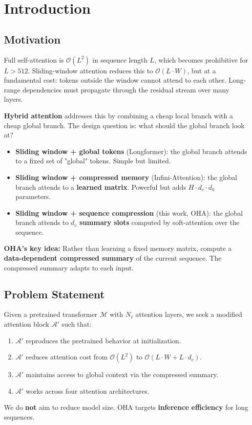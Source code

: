 
\section{Introduction}

\subsection{Motivation}

Full self-attention is $\mathcal{O}(L^2)$ in sequence length $L$, which 
becomes prohibitive for $L > 512$. Sliding-window attention reduces this to 
$\mathcal{O}(L \cdot W)$, but at a fundamental cost: tokens outside the window 
cannot attend to each other. Long-range dependencies must propagate through 
the residual stream over many layers.

\textbf{Hybrid attention} addresses this by combining a cheap local branch with 
a cheap global branch. The design question is: what should the global branch 
look at?

\begin{itemize}
\item \textbf{Sliding window + global tokens} (Longformer): the global branch attends
  to a fixed set of "global" tokens. Simple but limited.
\item \textbf{Sliding window + compressed memory} (Infini-Attention): the global
  branch attends to a \textbf{learned matrix}. Powerful but adds $H \cdot d_c \cdot d_h$
  parameters.
\item \textbf{Sliding window + sequence compression} (this work, OHA): the global
  branch attends to \textbf{$d_c$ summary slots} computed by soft-attention over
  the sequence.

\end{itemize}
\textbf{OHA's key idea:} Rather than learning a fixed memory matrix, compute a 
\textbf{data-dependent compressed summary} of the current sequence. The compressed 
summary adapts to each input.

\subsection{Problem Statement}

Given a pretrained transformer $\mathcal{M}$ with $N_\ell$ attention layers, 
we seek a modified attention block $\mathcal{A}'$ such that:

\begin{enumerate}
\item $\mathcal{A}'$ reproduces the pretrained behavior at initialization.
\item $\mathcal{A}'$ reduces attention cost from $\mathcal{O}(L^2)$ to
  $\mathcal{O}(L \cdot W + L \cdot d_c)$.
\item $\mathcal{A}'$ maintains access to global context via the compressed
  summary.
\item $\mathcal{A}'$ works across four attention architectures.

\end{enumerate}
We do \textbf{not} aim to reduce model size. OHA targets \textbf{inference efficiency} 
for long sequences.

